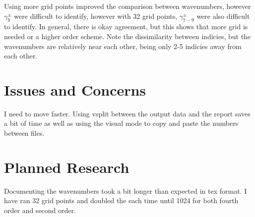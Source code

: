 \documentclass[a4paper]{article}
\begin{document}
Using more grid points improved the comparison between wavenumbers, however 
$\gamma_9^{\pm}$ were difficult to identify, however with 32 grid points, $\gamma_{7-9}^{\pm}$ were 
also difficult to identify. In general, there is okay agreement, but this shows 
that more grid is needed or a higher order scheme. Note the dissimilarity between
indicies, but the wavenumbers are relatively near each other, being only 2-5
indicies away from each other. 
%
%


\section{Issues and Concerns}
I need to move faster. Using vsplit between the output data and the report saves
a bit of time as well as using the visual mode to copy and paste the numbers between files.
\section{Planned Research}
Documenting the wavenumbers took a bit longer than expected in tex format. I have
ran 32 grid points and doubled the each time until 1024 for both fourth order 
and second order. 
\end{document}
